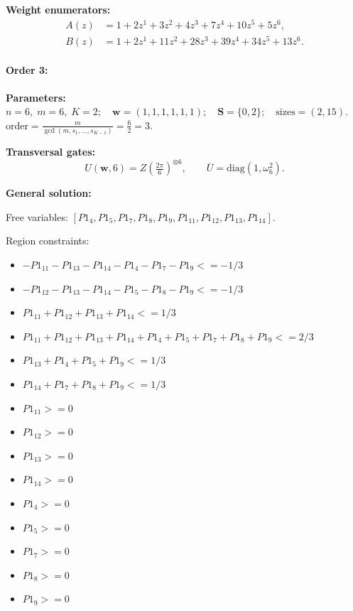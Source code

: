 \documentclass[11pt]{article}
\begin{document}
\noindent\textbf{Weight enumerators:}
\begin{align*}
A(z) &= 1 + 2z^{1} + 3z^{2} + 4z^{3} + 7z^{4} + 10z^{5} + 5z^{6},\\[2pt]
B(z) &= 1 + 2z^{1} + 11z^{2} + 28z^{3} + 39z^{4} + 34z^{5} + 13z^{6}.
\end{align*}

\paragraph{\textbf{Order 3:}}
\noindent\textbf{Parameters:} $n=6,\; m=6,\; K=2;\quad \mathbf w=(1, 1, 1, 1, 1, 1);\quad \mathbf S=\{0, 2\};\quad \text{sizes}=\left(2, 15\right).$ $\displaystyle \text{order}=\frac{m}{\gcd(m,s_1,\dots,s_{K-1})}=\frac{6}{2}=3.$

\noindent\textbf{Transversal gates:}
\[
    U(\mathbf w,6)=Z \left(\tfrac{2\pi}{6}\right)^{\otimes6},\qquad
    \overline U=\mathrm{diag}(1,\omega_{6}^{2}).
\]

\noindent\textbf{General solution:}

Free variables: $[P1_4, P1_5, P1_7, P1_8, P1_9, P1_{11}, P1_{12}, P1_{13}, P1_{14}]$.

Region constraints:
\begin{itemize}
    \item $-P1_{11} - P1_{13} - P1_{14} - P1_4 - P1_7 - P1_9 <= -1/3$
    \item $-P1_{12} - P1_{13} - P1_{14} - P1_5 - P1_8 - P1_9 <= -1/3$
    \item $P1_{11} + P1_{12} + P1_{13} + P1_{14} <= 1/3$
    \item $P1_{11} + P1_{12} + P1_{13} + P1_{14} + P1_4 + P1_5 + P1_7 + P1_8 + P1_9 <= 2/3$
    \item $P1_{13} + P1_4 + P1_5 + P1_9 <= 1/3$
    \item $P1_{14} + P1_7 + P1_8 + P1_9 <= 1/3$
    \item $P1_{11} >= 0$
    \item $P1_{12} >= 0$
    \item $P1_{13} >= 0$
    \item $P1_{14} >= 0$
    \item $P1_4 >= 0$
    \item $P1_5 >= 0$
    \item $P1_7 >= 0$
    \item $P1_8 >= 0$
    \item $P1_9 >= 0$
\end{itemize}
\end{document}
